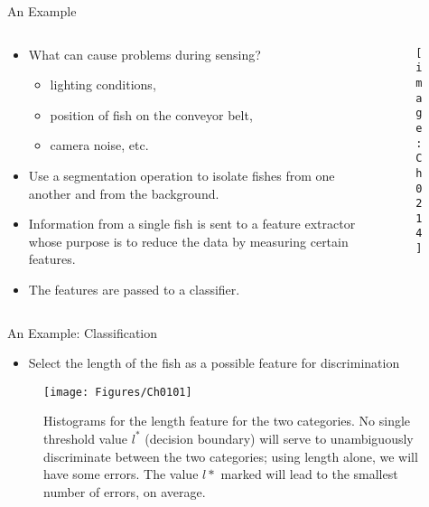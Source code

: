 \begin{frame}{An Example}
\begin{columns}
\begin{column}{7cm}
\begin{itemize}
\item What can cause problems during sensing?
\begin{itemize}
\item {\color{mycolor2}lighting conditions}, 
\item position of fish on the conveyor belt, 
\item camera noise, etc.
\end{itemize}
\item Use a segmentation operation to {\color{mycolor2}isolate fishes} from one another and from the {\color{mycolor2}background}.
\item Information from a single fish is sent to a {\color{mycolor1}feature extractor} whose purpose is to reduce the data by measuring certain features.
\item The features are passed to a classifier.
\end{itemize}
\end{column}
\begin{column}{5cm}
\begin{figure}
\texttt{[image: Ch0214]}
\end{figure}
\end{column}
\end{columns}
\end{frame}


\begin{frame}{An Example: Classification}
\begin{itemize}
\item Select the length of the fish as a possible feature for discrimination
\end{itemize}
\begin{figure}
\texttt{[image: Figures/Ch0101]}
\caption{Histograms for the length feature for the two categories. No single threshold value $l^*$ (decision boundary) will serve to unambiguously discriminate between the two categories; using length alone, we will have some errors. The value $l*$ marked will lead to the smallest number of errors, on average.}
\end{figure}
\end{frame}

